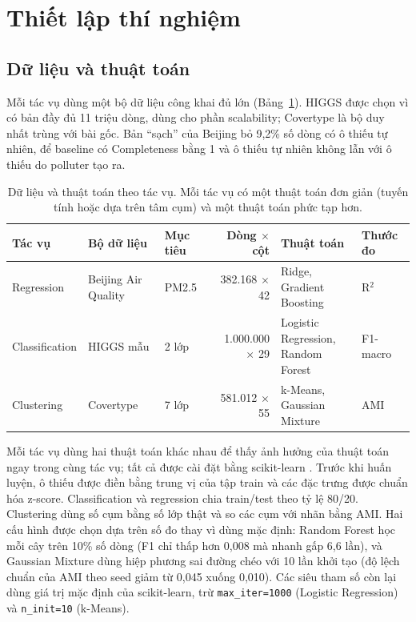 \section{Thiết lập thí nghiệm}
\label{sec:thiet-lap}

\subsection{Dữ liệu và thuật toán}

Mỗi tác vụ dùng một bộ dữ liệu công khai đủ lớn (Bảng~\ref{tab:datasets}). HIGGS được chọn vì có bản đầy đủ 11 triệu dòng, dùng cho phần scalability; Covertype là bộ duy nhất trùng với bài gốc. Bản ``sạch'' của Beijing bỏ 9,2\% số dòng có ô thiếu tự nhiên, để baseline có Completeness bằng 1 và ô thiếu tự nhiên không lẫn với ô thiếu do polluter tạo ra.

\begin{table}[htbp]
\centering
\small
\setlength{\tabcolsep}{3.5pt}
\begin{tabular}{@{}lllrll@{}}
\toprule
Tác vụ & Bộ dữ liệu & Mục tiêu & Dòng $\times$ cột & Thuật toán & Thước đo \\
\midrule
Regression     & Beijing Air Quality \citep{zhang2017cautionary} & PM2.5 & 382.168 $\times$ 42   & \makecell[l]{Ridge,\\Gradient Boosting} & R$^2$ \\
Classification & HIGGS mẫu \citep{baldi2014searching}            & 2 lớp & 1.000.000 $\times$ 29 & \makecell[l]{Logistic Regression,\\Random Forest} & F1-macro \\
Clustering     & Covertype \citep{blackard1999comparative}       & 7 lớp & 581.012 $\times$ 55   & \makecell[l]{k-Means,\\Gaussian Mixture} & AMI \\
\bottomrule
\end{tabular}
\caption{Dữ liệu và thuật toán theo tác vụ. Mỗi tác vụ có một thuật toán đơn giản (tuyến tính hoặc dựa trên tâm cụm) và một thuật toán phức tạp hơn.}
\label{tab:datasets}
\end{table}

Mỗi tác vụ dùng hai thuật toán khác nhau để thấy ảnh hưởng của thuật toán ngay trong cùng tác vụ; tất cả được cài đặt bằng scikit-learn \citep{pedregosa2011scikit}. Trước khi huấn luyện, ô thiếu được điền bằng trung vị của tập train và các đặc trưng được chuẩn hóa z-score. Classification và regression chia train/test theo tỷ lệ 80/20. Clustering dùng số cụm bằng số lớp thật và so các cụm với nhãn bằng AMI. Hai cấu hình được chọn dựa trên số đo thay vì dùng mặc định: Random Forest học mỗi cây trên 10\% số dòng (F1 chỉ thấp hơn 0,008 mà nhanh gấp 6,6 lần), và Gaussian Mixture dùng hiệp phương sai đường chéo với 10 lần khởi tạo (độ lệch chuẩn của AMI theo seed giảm từ 0,045 xuống 0,010). Các siêu tham số còn lại dùng giá trị mặc định của scikit-learn, trừ \texttt{max\_iter=1000} (Logistic Regression) và \texttt{n\_init=10} (k-Means).

